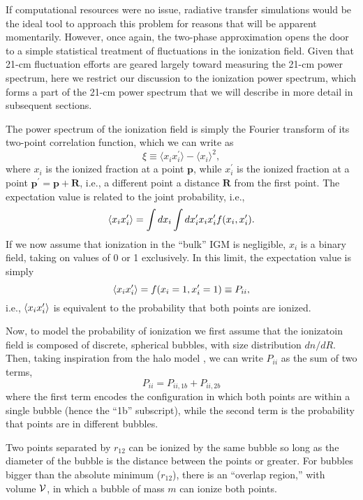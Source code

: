 If computational resources were no issue, radiative transfer simulations would be the ideal tool to approach this problem for reasons that will be apparent momentarily. However, once again, the two-phase approximation opens the door to a simple statistical treatment of fluctuations in the ionization field. Given that 21-cm fluctuation efforts are geared largely toward measuring the 21-cm power spectrum, here we restrict our discussion to the ionization power spectrum, which forms a part of the 21-cm power spectrum that we will describe in more detail in subsequent sections.

The power spectrum of the ionization field is simply the Fourier transform of its two-point correlation function, which we can write as
\begin{equation}
	\xi \equiv \langle x_i x_i^{\prime} \rangle - \langle x_i \rangle^2 ,
\end{equation}
where $x_i$ is the ionized fraction at a point $\mathbf{p}$, while $x_i^{\prime}$ is the ionized fraction at a point $\mathbf{p}^{\prime} = \mathbf{p} + \mathbf{R}$, i.e., a different point a distance $\mathbf{R}$ from the first point. The expectation value is related to the joint probability, i.e.,
\begin{equation}
	\langle x_i x_i^{\prime} \rangle = \int dx_i \int dx_i^{\prime} x_i x_i^{\prime} f(x_i, x_i^{\prime}) .
\end{equation}
If we now assume that ionization in the ``bulk'' IGM is negligible, $x_i$ is a binary field, taking on values of 0 or 1 exclusively. In this limit, the expectation value is simply
\begin{equation}
	\langle x_i x_i^{\prime} \rangle = f(x_i=1, x_i^{\prime}=1) \equiv P_{ii} ,
\end{equation}
i.e., $\langle x_i x_i^{\prime} \rangle$ is equivalent to the probability that both points are ionized. 

Now, to model the probability of ionization we first assume that the ionizatoin field is composed of discrete, spherical bubbles, with size distribution $dn/dR$. Then, taking inspiration from the halo model \cite{Cooray2002}, we can write $P_{ii}$ as the sum of two terms,
\begin{equation}
	P_{ii} = P_{ii,1b} + P_{ii,2b}
\end{equation}
where the first term encodes the configuration in which both points are within a single bubble (hence the ``1b'' subscript), while the second term is the probability that points are in different bubbles. 

Two points separated by $r_{12}$ can be ionized by the same bubble so long as the diameter of the bubble is the distance between the points or greater. For bubbles bigger than the absolute minimum ($r_{12}$), there is an ``overlap region,'' with volume $\mathcal{V}$, in which a bubble of mass $m$ can ionize both points.

